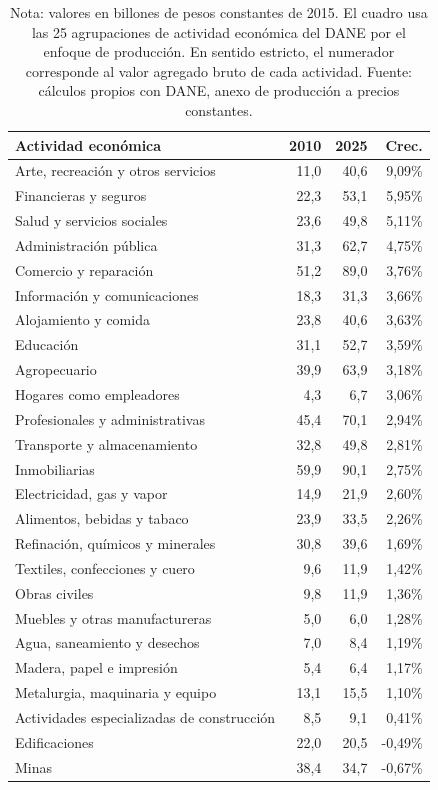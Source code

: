 \begin{table}[H]
\centering
\caption{PIB por actividad económica, 25 agrupaciones CIIU, 2010--2025}
\label{tab:valor_agregado_25_agrupaciones}
\small
\begin{tabular}{p{}rrr}
\toprule
Actividad económica & 2010 & 2025 & Crec. \\
\midrule
Arte, recreación y otros servicios & 11,0 & 40,6 & 9,09\% \\
Financieras y seguros & 22,3 & 53,1 & 5,95\% \\
Salud y servicios sociales & 23,6 & 49,8 & 5,11\% \\
Administración pública & 31,3 & 62,7 & 4,75\% \\
Comercio y reparación & 51,2 & 89,0 & 3,76\% \\
Información y comunicaciones & 18,3 & 31,3 & 3,66\% \\
Alojamiento y comida & 23,8 & 40,6 & 3,63\% \\
Educación & 31,1 & 52,7 & 3,59\% \\
Agropecuario & 39,9 & 63,9 & 3,18\% \\
Hogares como empleadores & 4,3 & 6,7 & 3,06\% \\
Profesionales y administrativas & 45,4 & 70,1 & 2,94\% \\
Transporte y almacenamiento & 32,8 & 49,8 & 2,81\% \\
Inmobiliarias & 59,9 & 90,1 & 2,75\% \\
Electricidad, gas y vapor & 14,9 & 21,9 & 2,60\% \\
Alimentos, bebidas y tabaco & 23,9 & 33,5 & 2,26\% \\
Refinación, químicos y minerales & 30,8 & 39,6 & 1,69\% \\
Textiles, confecciones y cuero & 9,6 & 11,9 & 1,42\% \\
Obras civiles & 9,8 & 11,9 & 1,36\% \\
Muebles y otras manufactureras & 5,0 & 6,0 & 1,28\% \\
Agua, saneamiento y desechos & 7,0 & 8,4 & 1,19\% \\
Madera, papel e impresión & 5,4 & 6,4 & 1,17\% \\
Metalurgia, maquinaria y equipo & 13,1 & 15,5 & 1,10\% \\
Actividades especializadas de construcción & 8,5 & 9,1 & 0,41\% \\
Edificaciones & 22,0 & 20,5 & -0,49\% \\
Minas & 38,4 & 34,7 & -0,67\% \\
\bottomrule
\end{tabular}
\caption*{\footnotesize Nota: valores en billones de pesos constantes de 2015. El cuadro usa las 25 agrupaciones de actividad económica del DANE por el enfoque de producción. En sentido estricto, el numerador corresponde al valor agregado bruto de cada actividad. Fuente: cálculos propios con DANE, anexo de producción a precios constantes.}
\end{table}

